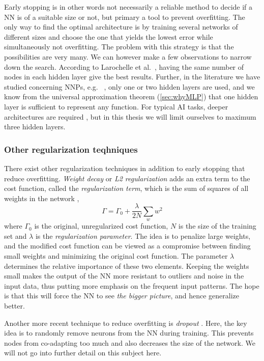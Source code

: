 \documentclass[twoside,english]{uiofysmaster}
\begin{document}
Early stopping is in other words not necessarily a reliable method to decide if a NN is of a suitable size or not, 
but primary a tool to prevent overfitting. 
The only way to find the optimal architecture is by training several networks of different sizes and choose the one that yields
the lowest error while simultaneously not overfitting. The problem with this strategy is that the possibilities are very many. 
We can however make a few observations to narrow down the search. 
According to Larochelle et al.\ \cite{Larochelle09}, having the same number of nodes in each hidden layer give the best results. 
Further, in the literature we have studied concerning NNPs, e.g.\ \cite{Behler07} \cite{Raff05} \cite{Witkoskie05}, 
only one or two hidden layers are used, and we know from the universal approximation theorem (\autoref{sec:whyMLP})
that one hidden layer is sufficient to represent any function. For typical AI tasks, deeper architectures are required 
\cite{Bengio07}, but in this thesis we will limit ourselves to maximum three hidden layers. 

\subsubsection{Other regularization teqhniques}
There exist other regularization techniques in addition to early stopping that reduce overfitting. 
\textit{Weight decay} or \textit{L2 regularization} adds an extra term to the cost function, called 
the \textit{regularization term}, which is the sum of squares of all weights in the network \cite{Krogh1992},
\begin{equation}
 \Gamma = \Gamma_0 + \frac{\lambda}{2N}\sum_w w^2
\end{equation}
where $\Gamma_0$ is the original, unregularized cost function, $N$ is the size of the training set and 
$\lambda$ is the \textit{regularization parameter}. The idea is to penalize large weights, and the modified 
cost function can be viewed as a compromise between finding small weights and minimizing the original cost function.
The parameter $\lambda$ determines the relative importance of these two elements. 
Keeping the weights small makes the output of the NN more resistant to outliers and noise in the input data, thus
putting more emphasis on the frequent input patterns. 
The hope is that this will force the NN to see \textit{the bigger picture}, 
and hence generalize better. 

Another more recent technique to reduce overfitting is \textit{dropout} \cite{Srivastava14}. Here, the key idea 
is to randomly remove neurons from the NN during training. This prevents nodes from co-adapting too much and 
also decreases the size of the network. We will not go into further detail on this subject here. 
\end{document}
